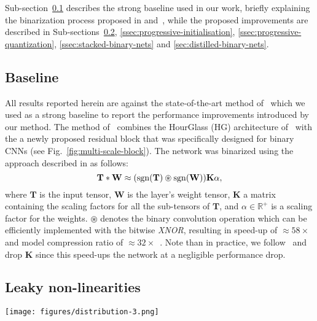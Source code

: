 \documentclass[10pt,twocolumn,letterpaper]{article}
\begin{document}
Sub-section~\ref{ssec:baseline} describes the strong baseline used in our work, briefly explaining the binarization process proposed in\cite{rastegari2016xnor} and~\cite{bulat2017binarized}, while the proposed improvements are described in Sub-sections~\ref{ssec:Symmetrical},  \ref{ssec:progressive-initialisation}, \ref{ssec:progressive-quantization}, \ref{ssec:stacked-binary-nets} and \ref{sec:distilled-binary-nets}.



\subsection{Baseline}\label{ssec:baseline}
All results reported herein are against the state-of-the-art method of~\cite{bulat2017binarized} which we used as a strong baseline to report the performance improvements introduced by our method. The method of~\cite{bulat2017binarized} combines the HourGlass (HG) architecture of~\cite{newell2016stacked} with the a newly proposed residual block that was specifically designed for binary CNNs (see Fig.~\ref{fig:multi-scale-block}). The network was binarized using the approach described in \cite{rastegari2016xnor} as follows:
\begin{equation}
    \mathbf{T} * \mathbf{W} \approx (\operatorname{sgn}(\mathbf{T}) \circledast \operatorname{sgn}(\mathbf{W}))\mathbf{K}\alpha   \label{eq:additive0},
\end{equation}
where $\mathbf{T}$ is the input tensor, $\mathbf{W}$ is the layer's weight tensor, $\mathbf{K}$ a matrix containing the scaling factors for all the sub-tensors of $\mathbf{T}$, and $\alpha \in \mathbb{R}^{+}$ is a scaling factor for the weights. $\circledast$ denotes the binary convolution operation which can be efficiently implemented with the bitwise \textit{XNOR}, resulting in speed-up of $\approx 58\times$ and model compression ratio of $\approx 32\times$~\cite{rastegari2016xnor}. Note than in practice, we follow~\cite{bulat2017binarized,rastegari2016xnor} and drop $\mathbf{K}$ since this speed-ups the network at a negligible performance drop. 

\subsection{Leaky non-linearities} \label{ssec:Symmetrical}

\begin{figure*}[!htbp]
    \centering
    \texttt{[image: figures/distribution-3.png]}
    \caption{Weight distribution for various layers from a network using PReLU (first row) and ReLU (second row) as we advance in the network (from left to right). The ReLU tends to push the weights closer to 0 making a jump between states more likely, thus causing the observed instabilities.}
    \label{fig:weights-distribution}
\end{figure*}
\end{document}
